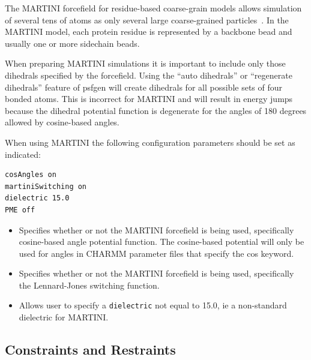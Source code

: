 The MARTINI forcefield for residue-based coarse-grain models allows simulation of several tens of atoms as only several large coarse-grained particles~\cite{MARR2004, MARR2007, MONT2008}.  In the MARTINI model, each protein residue is represented by a backbone bead and usually one or more sidechain beads.  

When preparing MARTINI simulations it is important to include only those
dihedrals specified by the forcefield.  Using the ``auto dihedrals'' or 
``regenerate dihedrals'' feature of psfgen will create dihedrals for all
possible sets of four bonded atoms.  This is incorrect for MARTINI and
will result in energy jumps because the dihedral potential function is
degenerate for the angles of 180 degrees allowed by cosine-based angles.

When using MARTINI the following configuration parameters should be set as indicated:

\begin{verbatim}
cosAngles on
martiniSwitching on
dielectric 15.0
PME off
\end{verbatim}

\begin{itemize}

\item
{}
{Specifies whether or not the MARTINI forcefield is being used, specifically cosine-based angle potential function.
The cosine-based potential will only be used for angles in CHARMM parameter files that specify the cos keyword.} 

\item
{}
{Specifies whether or not the MARTINI forcefield is being used, specifically the Lennard-Jones switching function.} 

\item
{}
{Allows user to specify a {\tt dielectric} not equal to 15.0, ie a non-standard dielectric for MARTINI.}

\end{itemize}


\subsection{Constraints and Restraints}

